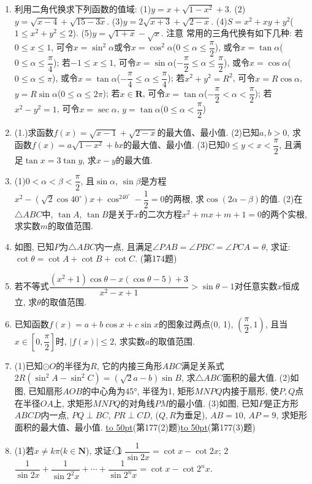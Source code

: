 \documentclass[10pt,a4paper]{article}
\newcommand{\blank}[1]{\underline{\hbox to #1pt{}}}
\begin{document}
\begin{enumerate}[1.]
(第170题)
\item 利用二角代换求下列函数的值域:
(1)$y=x+\sqrt {1-x^2}+3$.					(2)$y=\sqrt {x-4}+\sqrt {15-3x}$.
(3)$y=2\sqrt {x+3}+\sqrt {2-x}$.				(4)$S=x^2+xy+y^2$($1\le x^2+y^2\le 2$).
(5)$y=\sqrt {1+x}-\sqrt x$.
注意  常用的三角代换有如下几种:
若$0\le x\le 1$, 可令$x=\sin ^2\alpha$或令$x=\cos ^2\alpha$($0\le \alpha \le \dfrac{\pi }2$), 或令$x=\tan \alpha$($0\le \alpha \le \dfrac{\pi }4$);
若$-1\le x\le 1$, 可令$x=\sin \alpha$($-\dfrac{\pi }2\le \alpha \le \dfrac{\pi }2$), 或令$x=\cos \alpha$($0\le \alpha \le \pi$), 或令$x=\tan \alpha$($-\dfrac{\pi }4\le \alpha \le \dfrac{\pi }4$);
若$x^2+y^2=R^2$, 可令$x=R\cos \alpha$, $y=R\sin \alpha$($0\le \alpha \le 2\pi$);
若$x\in \mathbf{R}$, 可令$x=\tan \alpha$($-\dfrac{\pi }2<\alpha <\dfrac{\pi }2$);
若$x^2-y^2=1$, 可令$x=\sec \alpha$, $y=\tan \alpha$($0\le \alpha <\dfrac{\pi }2$)
\item (1.)求函数$f(x)=\sqrt {x-1}+\sqrt {2-x}$的最大值、最小值.
(2)已知$a,b>0$, 求函数$f(x)=a\sqrt {1-x^2}+bx$的最大值、最小值.
(3)已知$0\le y<x<\dfrac{\pi }2$, 且满足$\tan x=3\tan y$, 求$x-y$的最大值.
\item (1)$0<\alpha <\beta <\dfrac{\pi }2$, 且$\sin \alpha$, $\sin \beta$是方程$x^2-(\sqrt 2\cos 40^\circ)x+\cos ^240^\circ -\dfrac 12=0$的两根, 求$\cos (2\alpha -\beta)$的值.
(2)在$\triangle ABC$中, $\tan A$, $\tan B$是关于$x$的二次方程$x^2+mx+m+1=0$的两个实根, 求实数$m$的取值范围.
\item 如图, 已知$P$为$\triangle ABC$内一点, 且满足$\angle PAB=\angle PBC=\angle PCA=\theta$, 求证: $\cot \theta =\cot A+\cot B+\cot C$.
(第174题)
\item 若不等式$\dfrac{(x^2+1)\cos \theta -x(\cos \theta -5)+3}{x^2-x+1}>\sin \theta -1$对任意实数$x$恒成立, 求$\theta$的取值范围.
\item 已知函数$f(x)=a+b\cos x+c\sin x$的图象过两点(0, 1), $(\dfrac{\pi }2,1)$, 且当$x\in [0,\dfrac{\pi }2]$时, $|f(x)|\le 2$, 求实数$a$的取值范围.
\item (1)已知$\odot O$的半径为$R$, 它的内接三角形$ABC$满足关系式$2R(\sin ^2A-\sin ^2C)=(\sqrt 2a-b)\sin B$, 求$\triangle ABC$面积的最大值.
(2)如图, 已知扇形$AOB$的中心角为45°, 半径为1, 矩形$MNPQ$内接于扇形, 使$P,Q$点在半径$OA$上, 求矩形$MNPQ$的对角线$PM$的最小值.
(3)如图, 已知$P$是正方形$ABCD$内一点, $PQ\perp BC$, $PR\perp CD$, ($Q,R$为垂足), $AB=10$, $AP=9$, 求矩形面积的最大值、最小值.
\blank{50}(第177(2)题)\blank{50}(第177(3)题)
\item (1)若$x\ne k\pi$($k\in \mathbf{N}$), 求证:
\textcircled{1} $\dfrac 1{\sin 2x}=\cot x-\cot 2x$;
\textcircled{2} $\dfrac 1{\sin 2x}+\dfrac 1{\sin 2^2x}+\cdots +\dfrac 1{\sin 2^nx}=\cot x-\cot 2^nx$.

\end{enumerate}
\end{document}
